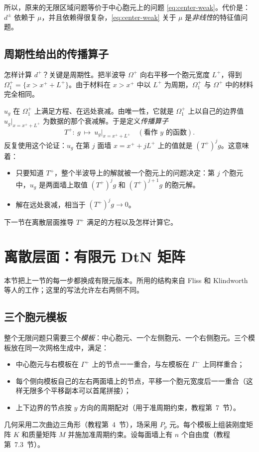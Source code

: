 \documentclass[11pt,a4paper,fontset=fandol]{ctexart}
\begin{document}
所以，原来的无限区域问题等价于中心胞元上的问题 \eqref{eq:center-weak}。代价是：$d^\pm$ 依赖于 $\mu$，并且依赖得很复杂，\eqref{eq:center-weak} 关于 $\mu$ 是\emph{非线性}的特征值问题。

\subsection{周期性给出的传播算子}
\label{sec:propagation}

怎样计算 $d^+$？关键是周期性。把半波导 $\Omega^+$ 向右平移一个胞元宽度 $L^+$，得到 $\Omega^+_1=\{x>x^++L^+\}$。由于材料在 $x>x^+$ 中以 $L^+$ 为周期，$\Omega^+_1$ 与 $\Omega^+$ 中的材料完全相同。

$u_g$ 在 $\Omega^+_1$ 上满足方程、在远处衰减。由唯一性，它就是 $\Omega^+_1$ 上以自己的边界值 $u_g|_{x=x^++L^+}$ 为数据的那个衰减解。于是定义\emph{传播算子}
\[
T^+:\ g\ \longmapsto\ u_g|_{x=x^++L^+}\quad(\text{看作 }y\text{ 的函数}).
\]
反复使用这个论证：$u_g$ 在第 $j$ 面墙 $x=x^++jL^+$ 上的值就是 $(T^+)^jg$。这意味着：
\begin{itemize}
\item 只要知道 $T^+$，整个半波导上的解就被一个胞元上的问题决定：第 $j$ 个胞元中，$u_g$ 是两面墙上取值 $(T^+)^jg$ 和 $(T^+)^{j+1}g$ 的胞元解。
\item 解在远处衰减，相当于 $(T^+)^jg\to0$。
\end{itemize}
下一节在离散层面推导 $T^+$ 满足的方程以及怎样计算它。

\section{离散层面：有限元 DtN 矩阵}
\label{sec:discrete-dtn}

本节把上一节的每一步都换成有限元版本。所用的结构来自 Fliss 和 Klindworth 等人的工作\citep{Fliss2013,KlindworthSchmidtFliss2014}；这里的写法允许左右两侧不同。

\subsection{三个胞元模板}

整个无限问题只需要三个\emph{模板}：中心胞元、一个左侧胞元、一个右侧胞元。三个模板放在同一次网格生成中，满足：
\begin{itemize}
\item 中心胞元与右模板在 $\Gamma^+$ 上的节点一一重合，与左模板在 $\Gamma^-$ 上同样重合；
\item 每个侧向模板自己的左右两面墙上的节点，平移一个胞元宽度后一一重合（这样无限多个平移副本可以首尾拼接）；
\item 上下边界的节点按 $y$ 方向的周期配对（用于准周期约束，教程第~7~节）。
\end{itemize}
几何采用二次曲边三角形（教程第~4~节），场采用 $P_p$ 元。每个模板上组装刚度矩阵 $K$ 和质量矩阵 $M$ 并施加准周期约束。设每面墙上有 $n$ 个自由度（教程第~7.3~节）。
\end{document}
